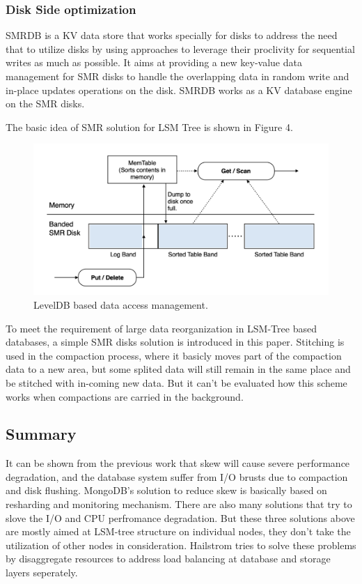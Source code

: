 \documentclass[a4paper,10pt,twoside]{article}
\begin{document}
\subsubsection{Disk Side optimization}
SMRDB \cite{SMRDB} is a KV data store that works specially for disks to address the need that to utilize disks by using approaches to leverage their proclivity for sequential writes as much as possible.
It aims at providing a new key-value data management for SMR disks to handle the overlapping data in random write and in-place updates operations on the disk.
SMRDB works as a KV database engine on the SMR disks. 
\par
The basic idea of SMR solution for LSM Tree is shown in Figure 4.
\begin{figure}[h]
    \centering
	\includegraphics[scale=0.3]{SMR.png}
    \caption{ LevelDB based data access management.}
    \label{fig:mesh1}
\end{figure}
To meet the requirement of large data reorganization in LSM-Tree based databases, a simple SMR disks solution is introduced in this paper.
Stitching is used in the compaction process, where it basicly moves part of the compaction data to a new area, 
but some splited data will still remain in the same place and be stitched with in-coming new data.
But it can't be evaluated how this scheme works when compactions are carried in the background.



\subsection{Summary}
It can be shown from the previous work that skew will cause severe performance degradation, and the database system suffer from I/O brusts due to compaction and disk flushing.
MongoDB's solution to reduce skew is basically based on resharding and monitoring mechanism.
There are also many solutions that try to slove the I/O and CPU perfromance degradation.
But these three solutions above are mostly aimed at LSM-tree structure on individual nodes, they don't take the utilization of other nodes in consideration.
Hailstrom tries to solve these problems by disaggregate resources to address load balancing at database and storage layers seperately.
\end{document}
